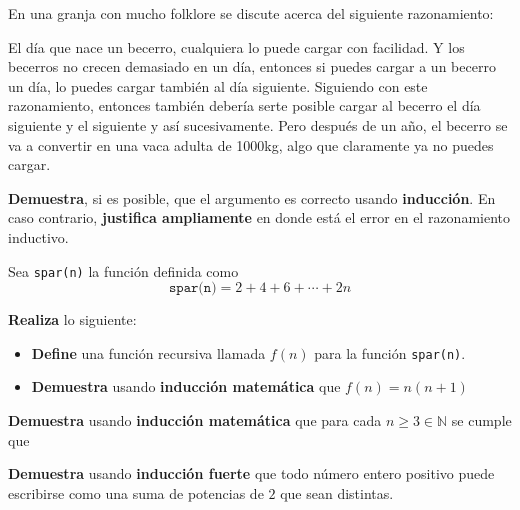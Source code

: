 \documentclass[oneside]{style}
\begin{document}
\begin{questions}[label=\protect\circled{\bfseries\arabic*}]
    \question
    {
        En una granja con mucho folklore se discute acerca del siguiente 
        razonamiento: 
        \begin{tcolorbox}
            El día que nace un becerro, cualquiera lo puede cargar con 
            facilidad. Y los becerros no crecen demasiado en un día, entonces 
            si puedes cargar a un becerro un día, lo puedes cargar también al 
            día siguiente. Siguiendo con este razonamiento, entonces también 
            debería serte posible cargar al becerro el día siguiente y el 
            siguiente y así sucesivamente. Pero después de un año, el becerro 
            se va a convertir en una vaca adulta de 1000kg, algo que claramente 
            ya no puedes cargar.
        \end{tcolorbox}

        \textbf{Demuestra}, si es posible, que el argumento es correcto 
        usando \textbf{inducción}. En caso contrario, \textbf{justifica 
        ampliamente} en donde está el error en el razonamiento inductivo. 
    }

    \question
    {
        Sea \texttt{spar(n)} la función definida como 
        \begin{equation*}
            \texttt{spar(n)} = 2 + 4 + 6 + \cdots + 2n
        \end{equation*}

        \textbf{Realiza} lo siguiente:
        \begin{itemize}
            \item \textbf{Define} una función recursiva llamada 
            $f(n)$ para la función \texttt{spar(n)}.

            \item \textbf{Demuestra} usando \textbf{inducción 
            matemática} que $f(n) = n(n+1)$
        \end{itemize}
    }

    \question
    {
        \textbf{Demuestra} usando \textbf{inducción matemática} que para cada 
        $n \geq 3 \in \mathbb{N}$ se cumple que
        \begin{center}
        \end{center}
    }

    \question
    {
        \textbf{Demuestra} usando \textbf{inducción fuerte} que todo número 
        entero positivo puede escribirse como una suma de potencias de $2$ que 
        sean distintas. 
    }
\end{questions}
\end{document}
